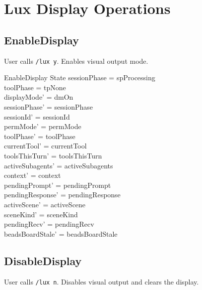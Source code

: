 \documentclass[a4paper,10pt,fleqn]{article}
\begin{document}
\section{Lux Display Operations}

\subsection{EnableDisplay}

User calls \texttt{/lux y}. Enables visual output mode.

\begin{schema}{EnableDisplay}
  \Delta State
  \where
  sessionPhase = spProcessing \\
  toolPhase = tpNone \\
  displayMode' = dmOn \\
  sessionPhase' = sessionPhase \\
  sessionId' = sessionId \\
  permMode' = permMode \\
  toolPhase' = toolPhase \\
  currentTool' = currentTool \\
  toolsThisTurn' = toolsThisTurn \\
  activeSubagents' = activeSubagents \\
  context' = context \\
  pendingPrompt' = pendingPrompt \\
  pendingResponse' = pendingResponse \\
  activeScene' = activeScene \\
  sceneKind' = sceneKind \\
  pendingRecv' = pendingRecv \\
  beadsBoardStale' = beadsBoardStale
\end{schema}

\subsection{DisableDisplay}

User calls \texttt{/lux n}. Disables visual output and clears
the display.
\end{document}
